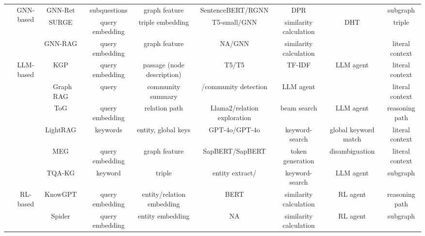 \documentclass[lettersize,journal]{IEEEtran}
\newcommand{\xmark}{\ding{55}}%
\begin{document}
\begin{table}[t]
{\begin{tabular}{ccccccccc}
\cmidrule(lr){2-9}

&\multirow{3}{*}{GNN-based } &GNN-Ret~\cite{li2024graph}   & subquestions & graph feature& SentenceBERT/RGNN& DPR & \xmark &subgraph\\
&  &SURGE~\cite{kang2023knowledge}  &query embedding  &triple embedding  &T5-small/GNN  &similarity calculation & DHT &triple \\
&  &GNN-RAG~\cite{dong2024advanced}  &query embedding  &  graph feature  & NA/GNN&similarity calculation & \xmark & literal context \\
\cmidrule(lr){2-9}

&\multirow{6}{*}{LLM-based } &KGP~\cite{wang2024knowledge} &query embedding  &passage (node description)  & T5/T5 &TF-IDF &LLM agent  & literal context \\
& &Graph RAG~\cite{edge2024local} & query & community summary & \xmark/community detection & LLM agent & \xmark &literal context \\
&  &ToG~\cite{sun2024thinkongraph}  &query embedding  &relation path   &Llama2/relation exploration &beam search &LLM agent &reasoning path \\
& &LightRAG~\cite{guo2024lightrag} & keywords & entity, global keys &GPT-4o/GPT-4o &keyword-search &global keyword match &literal context\\
&  &MEG~\cite{cabello2024meg}  &query embedding  &graph feature   &SapBERT/SapBERT &token generation & disambiguation &literal context \\
& &TQA-KG~\cite{he2024enhancing}& keyword  & triple    &entity extract/\xmark &keyword-search &LLM agent &subgraph \\
\cmidrule(lr){2-9}

&\multirow{2}{*}{RL-based }& KnowGPT~\cite{Zhang-etal24KnowGPT} &query embedding  & entity/relation embedding &BERT & similarity calculation & RL agent & reasoning path \\
&  &Spider~\cite{shen2025insight}  &query embedding  & entity embedding &NA & similarity calculation & RL agent & subgraph \\

\midrule


\end{tabular}}
\end{table}
\end{document}
